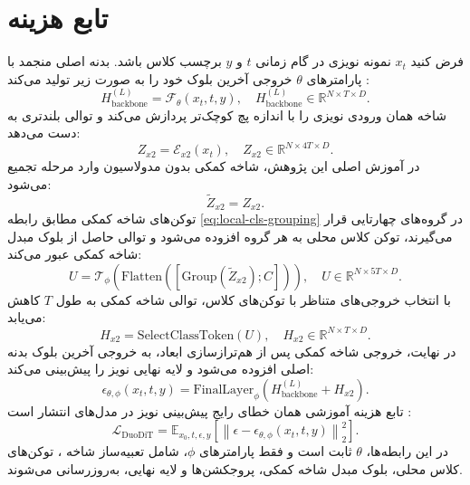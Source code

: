 \section{تابع هزینه}
فرض کنید $x_t$ نمونه نویزی در گام زمانی $t$ و $y$ برچسب کلاس باشد. بدنه اصلی منجمد با پارامترهای $\theta$ خروجی آخرین بلوک خود را به صورت زیر تولید می‌کند \cite{6206256,2212.09748}:
\begin{equation}
    \label{eq:backbone-final}
    H_{\text{backbone}}^{(L)} = \mathcal{F}_{\theta}(x_t, t, y), \quad
    H_{\text{backbone}}^{(L)} \in \mathbb{R}^{N \times T \times D}.
\end{equation}
شاخه  همان ورودی نویزی را با اندازه پچ کوچک‌تر پردازش می‌کند و توالی بلندتری به دست می‌دهد:
\begin{equation}
    \label{eq:x2-embed}
    Z_{x2} = \mathcal{E}_{x2}(x_t), \quad
    Z_{x2} \in \mathbb{R}^{N \times 4T \times D}.
\end{equation}
در آموزش اصلی این پژوهش، شاخه کمکی بدون مدولاسیون  وارد مرحله تجمیع می‌شود:
\begin{equation}
    \label{eq:x2-film}
    \tilde{Z}_{x2} = Z_{x2}.
\end{equation}
توکن‌های شاخه کمکی مطابق رابطه \ref{eq:local-cls-grouping} در گروه‌های چهارتایی قرار می‌گیرند، توکن کلاس محلی به هر گروه افزوده می‌شود و توالی حاصل از بلوک مبدل شاخه کمکی عبور می‌کند:
\begin{equation}
    \label{eq:x2-expert}
    U = \mathcal{T}_{\phi}(\text{Flatten}([\text{Group}(\tilde{Z}_{x2}); C])),
    \quad U \in \mathbb{R}^{N \times 5T \times D}.
\end{equation}
با انتخاب خروجی‌های متناظر با توکن‌های کلاس، توالی شاخه کمکی به طول $T$ کاهش می‌یابد:
\begin{equation}
    \label{eq:x2-cls-sequence}
    H_{x2} = \text{SelectClassToken}(U), \quad
    H_{x2} \in \mathbb{R}^{N \times T \times D}.
\end{equation}
در نهایت، خروجی شاخه کمکی پس از هم‌ترازسازی ابعاد، به خروجی آخرین بلوک بدنه اصلی افزوده می‌شود و لایه نهایی نویز را پیش‌بینی می‌کند:
\begin{equation}
    \label{eq:duodit-output}
    \epsilon_{\theta,\phi}(x_t,t,y) =
    \text{FinalLayer}_{\phi}(H_{\text{backbone}}^{(L)} + H_{x2}).
\end{equation}
تابع هزینه آموزشی همان خطای رایج پیش‌بینی نویز در مدل‌های انتشار است \cite{6206256,2212.09748}:
\begin{equation}
    \label{eq:duodit-loss}
    \mathcal{L}_{\text{DuoDiT}} =
    \mathbb{E}_{x_0,t,\epsilon,y}
    \left[
    \left\|
    \epsilon - \epsilon_{\theta,\phi}(x_t,t,y)
    \right\|_2^2
    \right].
\end{equation}
در این رابطه‌ها، $\theta$ ثابت است و فقط پارامترهای $\phi$، شامل تعبیه‌ساز شاخه ، توکن‌های کلاس محلی، بلوک مبدل شاخه کمکی، پروجکشن‌ها و لایه نهایی، به‌روزرسانی می‌شوند.

